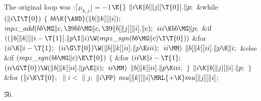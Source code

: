 The original loop was
\Y\B\4:$\lceil\mu_{k,j}\rfloor = -1$\X${}\E{}$\6
$\|i\K\|b[\|j][\T{0}].\|p;{}$\6
\&{while} ${}(\|i\I\T{0}){}$\5
${}\{{}$\1\6
${}\\{bb}\K{\AND}(\|b[\|k][\|i]);{}$\6
${}\\{mpz\_add}(\\{bb}\MG\|c,\39\\{bb}\MG\|c,\39\|b[\|j][\|i].\|c);{}$\6
${}\\{iii}\K\\{bb}\MG\|p;{}$\6
\&{if} ${}((\|b[\|k][\|i-\T{1}].\|p\I\|i)\W(\\{mpz\_sgn}(\\{bb}\MG\|c)\I%
\T{0})){}$\1\6
\&{for} ${}(\\{ii}\K\|i-\T{1};{}$ ${}(\\{ii}\G\T{0})\W(\|b[\|k][\\{ii}].\|p\E%
\\{iii});{}$ ${}\\{ii}\MM){}$\1\5
${}\|b[\|k][\\{ii}].\|p\K\|i;{}$\2\2\6
\&{else} \&{if} ${}(\\{mpz\_sgn}(\\{bb}\MG\|c)\E\T{0}){}$\5
${}\{{}$\1\6
\&{for} ${}(\\{ii}\K\|i-\T{1};{}$ ${}(\\{ii}\G\T{0})\W(\|b[\|k][\\{ii}].\|p\E%
\|i);{}$ ${}\\{ii}\MM){}$\1\5
${}\|b[\|k][\\{ii}].\|p\K\\{iii};{}$\2\6
\4${}\}{}$\2\6
${}\|i\K\|b[\|j][\|i].\|p;{}$\6
\4${}\}{}$\2\6
\&{for} ${}(\|i\K\T{0};{}$ ${}\|i<\|j;{}$ ${}\|i\PP){}$\1\5
${}\\{mu}[\|k][\|i]\MRL{+{\K}}\\{mu}[\|j][\|i]{}$;\2\par
\U56.\fi


